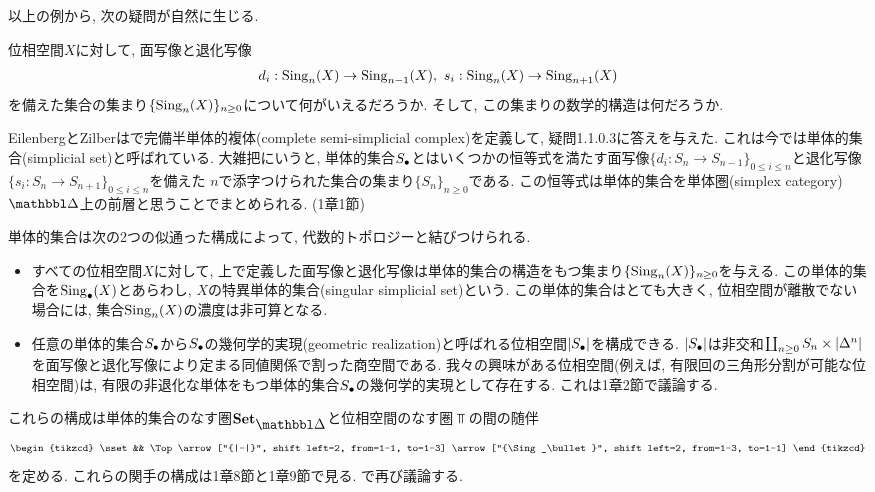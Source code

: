\documentclass[uplatex, a4paper, 14Q, dvipdfmx]{jsreport}
\begin{document}
以上の例から, 次の疑問が自然に生じる. 

\begin{que}
  位相空間$X$に対して, 面写像と退化写像
  \begin{align*}
    d_i: \Sing_n(X) \to \Sing_{n-1}(X),~ s_i: \Sing_n(X) \to \Sing_{n+1}(X)
  \end{align*}
  を備えた集合の集まり$\{\Sing_n(X)\}_{n \geq 0}$について何がいえるだろうか.
  そして, この集まりの数学的構造は何だろうか. 
\end{que}

EilenbergとZilberは\cite{EZ}で完備半単体的複体(complete semi-simplicial complex)を定義して, 疑問1.1.0.3に答えを与えた.
これは今では単体的集合(simplicial set)と呼ばれている. 
大雑把にいうと, 単体的集合$\S$とはいくつかの恒等式を満たす面写像$\{d_i: S_n \to S_{n-1}\}_{0 \leq i \leq n}$と退化写像$\{s_i: S_n \to S_{n+1}\}_{0 \leq i \leq n}$を備えた
$n$で添字つけられた集合の集まり$\{S_n\}_{n \geq 0}$である. 
この恒等式は単体的集合を単体圏(simplex category) $\csim$上の前層と思うことでまとめられる. (1章1節)

単体的集合は次の2つの似通った構成によって, 代数的トポロジーと結びつけられる. 
\begin{itemize}
  \item すべての位相空間$X$に対して, 上で定義した面写像と退化写像は単体的集合の構造をもつ集まり$\{\Sing_n(X)\}_{n \geq 0}$を与える. 
  この単体的集合を$\Sing_\bullet(X)$とあらわし, $X$の特異単体的集合(singular simplicial set)という.
  この単体的集合はとても大きく, 位相空間が離散でない場合には, 集合$\Sing_n(X)$の濃度は非可算となる. 
  \item 任意の単体的集合$\S$から$\S$の幾何学的実現(geometric realization)と呼ばれる位相空間$|\S|$を構成できる. 
  $|\S|$は非交和$\coprod_{n \geq 0}S_n \ti |\Delta^n|$を面写像と退化写像により定まる同値関係で割った商空間である. 
  我々の興味がある位相空間(例えば, 有限回の三角形分割が可能な位相空間)は, 有限の非退化な単体をもつ単体的集合$\S$の幾何学的実現として存在する.
  これは1章2節で議論する. 
\end{itemize}

これらの構成は単体的集合のなす圏$\sset$と位相空間のなす圏$\Top$の間の随伴
\[\begin{tikzcd}
	\sset && \Top
	\arrow["{|-|}", shift left=2, from=1-1, to=1-3]
	\arrow["{\Sing_\bullet}", shift left=2, from=1-3, to=1-1]
\end{tikzcd}\]
を定める. 
これらの関手の構成は1章8節と1章9節で見る. 
\cite[\href{https://kerodon.net/tag/007J}{Tag 007J}]{kerodon}で再び議論する. 
\end{document}
